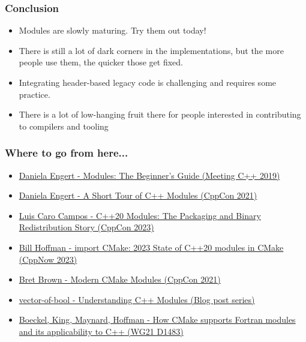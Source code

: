 \documentclass[aspectratio=169]{beamer}
\begin{document}
\begin{frame}
  \frametitle{Conclusion}

  \begin{itemize}
  \item Modules are slowly maturing. Try them out today!
  \item There is still a lot of dark corners in the implementations, but the more people use them, the quicker those get fixed.
  \item Integrating header-based legacy code is challenging and requires some
  practice.
  \item \alert<2>{There is a lot of low-hanging fruit there for people interested in contributing to compilers and tooling}
  \end{itemize}

\end{frame}

\begin{frame}
  \frametitle{Where to go from here...}

  \begin{itemize}
    \item \href{https://www.youtube.com/watch?v=Kqo-jIq4V3I}{Daniela Engert - Modules: The Beginner's Guide (Meeting C++ 2019)}
    \item \href{https://www.youtube.com/watch?v=nP8QcvPpGeM}{Daniela Engert - A Short Tour of C++ Modules (CppCon 2021)}
    \item \href{https://www.youtube.com/watch?v=-p9lvvV8F-w}{Luis Caro Campos - C++20 Modules: The Packaging and Binary Redistribution Story (CppCon 2023)}
    \item \href{https://www.youtube.com/watch?v=c563KgO-uf4}{Bill Hoffman - import CMake: 2023 State of C++20 modules in CMake (CppNow 2023)}
    \item \href{https://www.youtube.com/watch?v=IZXNsim9TWI}{Bret Brown - Modern CMake Modules (CppCon 2021)}
    \item \href{https://vector-of-bool.github.io/2019/03/10/modules-1.html}{vector-of-bool - Understanding C++ Modules (Blog post series)}
    \item \href{https://mathstuf.fedorapeople.org/fortran-modules/fortran-modules.html}{Boeckel, King, Maynard, Hoffman - How CMake supports Fortran modules and its applicability to C++ (WG21 D1483)}
  \end{itemize}
\end{frame}
\end{document}
